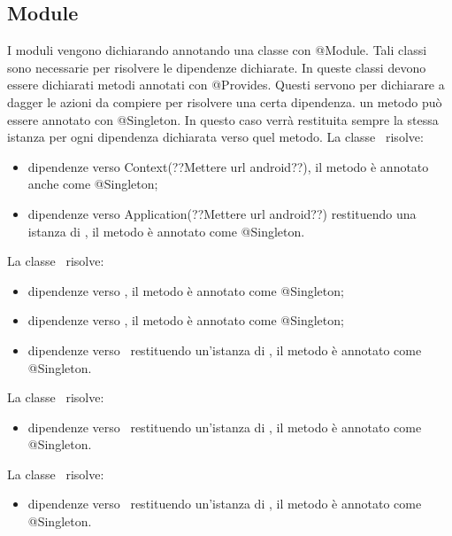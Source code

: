 \documentclass[../ManualeSviluppatore.tex]{subfiles}
\begin{document}
	\subsection{Module}
	I moduli vengono dichiarando annotando una classe con @Module. Tali classi sono necessarie per risolvere le dipendenze dichiarate. In queste classi devono essere dichiarati metodi annotati con @Provides. Questi servono per dichiarare a dagger le azioni da compiere per risolvere una certa dipendenza. un metodo può essere annotato con @Singleton. In questo caso verrà restituita sempre la stessa istanza per ogni dipendenza dichiarata verso quel metodo. 
	La classe \AppModule\ risolve:
	\begin{itemize}
		\item dipendenze verso Context(??Mettere url android??), il metodo è annotato anche come @Singleton;
		\item dipendenze verso Application(??Mettere url android??) restituendo una istanza di \MyApplication, il metodo è annotato come @Singleton.
	\end{itemize}
	La classe \DatabaseModule\ risolve:
	\begin{itemize}
		\item dipendenze verso \SQLiteDaoFactory, il metodo è annotato come @Singleton;
		\item dipendenze verso \RemoteDaoFactory, il metodo è annotato come @Singleton;
		\item dipendenze verso \DatabaseAccess\ restituendo un'istanza di \BuildingAccess, il metodo è annotato come @Singleton.
	\end{itemize}
	La classe \InfoModule\ risolve:
	\begin{itemize}
		\item dipendenze verso \InformationManager\ restituendo un'istanza di \InformationManagerImp, il metodo è annotato come @Singleton.
	\end{itemize}
	La classe \SettingModule\ risolve:
	\begin{itemize}
		\item dipendenze verso \Setting\ restituendo un'istanza di \SettingImp, il metodo è annotato come @Singleton.
	\end{itemize}
\end{document}

